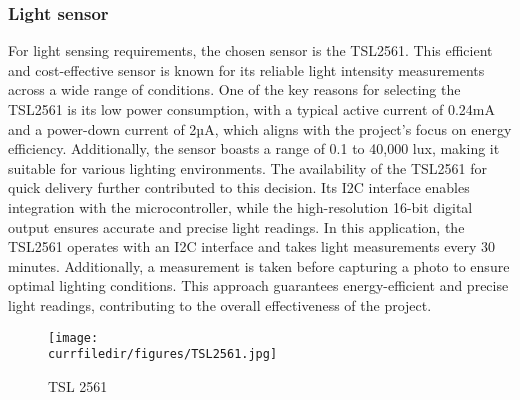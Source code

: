 \newpage
\subsubsection{Light sensor}
For light sensing requirements, the chosen sensor is the TSL2561. This efficient and cost-effective sensor is known for its reliable light intensity measurements across a wide range of conditions. One of the key reasons for selecting the TSL2561 is its low power consumption, with a typical active current of 0.24mA and a power-down current of 2µA, which aligns with the project's focus on energy efficiency. Additionally, the sensor boasts a range of 0.1 to 40,000 lux, making it suitable for various lighting environments. The availability of the TSL2561 for quick delivery further contributed to this decision. Its I2C interface enables integration with the microcontroller, while the high-resolution 16-bit digital output ensures accurate and precise light readings.
In this application, the TSL2561 operates with an I2C interface and takes light measurements every 30 minutes. Additionally, a measurement is taken before capturing a photo to ensure optimal lighting conditions. This approach guarantees energy-efficient and precise light readings, contributing to the overall effectiveness of the project.
\begin{figure}[!h]
    \centering
    \texttt{[image: \\currfiledir/figures/TSL2561.jpg]}
    \caption{TSL 2561}
    \cite{Light}
\end{figure}